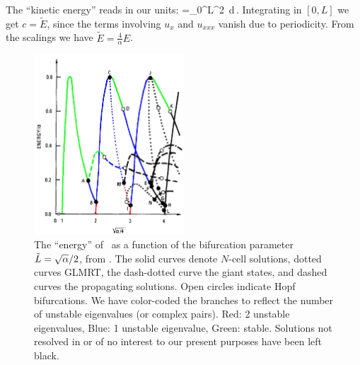 The ``kinetic energy'' reads in our units:
\beq
    =\int_0^{L}^2\, d\,.
\eeq
Integrating  in $[0,L]$ we get $c=\tilde{E}$,
since the terms involving $u_x$ and $u_{xxx}$ vanish due to periodicity.
From the scalings  we have $\tilde{E}=\frac{4}{\alpha}E$.


\begin{figure} \label{fig:GreeneKim}
\centering
\includegraphics[width=0.5\textwidth]{../rpo_ks/figsUnused/GreeneKimBifColor}
\caption[The ``energy'' of \eqva\ as a function of the bifurcation parameter]
        {
The ``energy'' of \eqva\ as a function of the bifurcation
parameter $\tilde{L}=\sqrt{\alpha}/2$, from .
The solid curves denote $N$-cell solutions,
dotted curves GLMRT, the dash-dotted curve the
giant states, and dashed curves the propagating solutions.
Open circles indicate Hopf bifurcations.
We have color-coded the branches to reflect the number of unstable
eigenvalues (or complex pairs). Red: 2 unstable eigenvalues, Blue: 1
unstable eigenvalue, Green: stable. Solutions not
resolved in  or of no interest
to our present purposes have been left black.
        }
\end{figure}

